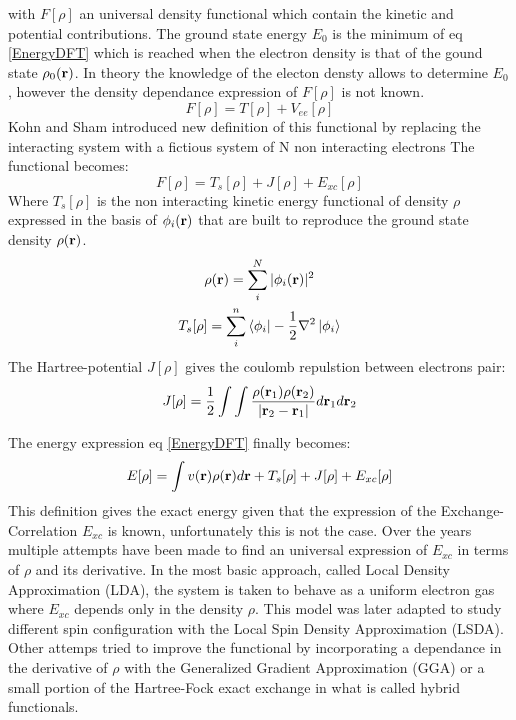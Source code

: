 \documentclass[10pt]{report}
\numberwithin{equation}{section}
\begin{document}
with $F[\rho]$ an universal density functional which contain the kinetic and potential contributions.
The ground state energy $E_0$ is the minimum of eq \ref{EnergyDFT} which is reached when the electron density is that of the gound state $\rho_0(\vb r)$.
In theory the knowledge of the electon densty allows to determine $E_0$, however the density dependance expression of $F[\rho]$ is not known.
\begin{equation}
    F[\rho]=T[\rho]+V_{ee}[\rho]
\end{equation}
Kohn and Sham introduced new definition of this functional by replacing the interacting system with a fictious system of N non interacting electrons%
The functional becomes:
\begin{equation}
    F[\rho]=T_s[\rho]+J[\rho]+E_{xc}[\rho]
\end{equation}
Where $T_s[\rho]$ is the non interacting kinetic energy functional of density $\rho$ expressed in the basis of $\phi_i (\vb r)$ that are built to reproduce the ground state density $\rho(\vb r)$.
\begin{gather}
    \rho(\vb r) = \sum_{i}^{N} |\phi_i (\vb r)|^2\\
    T_s[\rho]=\sum_{i}^{n} \bra{\phi_i} -\frac{1}{2}\nabla^2 \ket{\phi_i}
\end{gather}
The Hartree-potential $J[\rho]$ gives the coulomb repulstion between electrons pair:
\begin{equation}
    J[\rho]=\frac{1}{2}\int\int \frac{\rho(\vb r_1) \rho(\vb r_2)}{|\vb r_2 - \vb r_1 |} d\vb r_1 d\vb r_2
\end{equation}

The energy expression eq \ref{EnergyDFT} finally becomes:
\begin{equation}
    E[\rho]= \int v(\vb r) \rho(\vb r) d\vb r + T_s[\rho] + J[\rho]+ E_{xc}[\rho]
\end{equation}
This definition gives the exact energy given that the expression of the Exchange-Correlation $E_{xc}$ is known, unfortunately this is not the case. 
Over the years multiple attempts have been made to find an universal expression of $E_{xc}$ in terms of $\rho$ and its derivative. 
In the most basic approach, called Local Density Approximation (LDA), the system is taken to behave as a uniform electron gas where $E_{xc}$ depends only in the density $\rho$. 
This model was later adapted to study different spin configuration with the Local Spin Density Approximation (LSDA).
Other attemps tried to improve the functional by incorporating a dependance in the derivative of $\rho$ with the Generalized Gradient Approximation (GGA) or a small portion of the Hartree-Fock exact exchange in what is called hybrid functionals.
\end{document}
